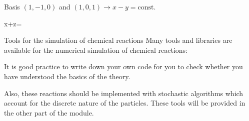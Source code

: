 Basis $(1,-1,0)$ and $(1,0,1) \rightarrow x-y=\text{const.}$
\begin{DispWithArrows}[displaystyle, format=c]
x+z=
\end{DispWithArrows}
Tools for the simulation of chemical reactions
Many tools and libraries are available for the numerical simulation of chemical 
reactions:


It is good practice to write down your own code for you to check whether you
have understood the basics of the theory.

Also, these reactions should be implemented with stochastic algorithms which
account for the discrete nature of the particles. These tools will be provided
in the other part of the module.

